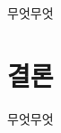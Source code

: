 \documentclass[a4paper, 10pt, nanum]{CSUniSchoolLabReport}
\begin{document}
	무엇무엇



\section{결론}

	무엇무엇



\end{document}
